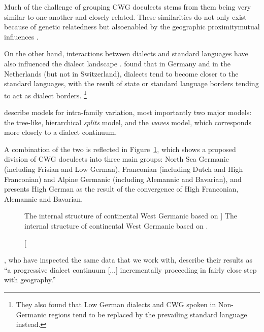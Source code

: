 \documentclass[a4paper]{article}
\begin{document}
Much of the challenge of grouping CWG doculects stems from
them being very similar to one another and closely related.
These similarities do not only exist because of genetic relatedness
but also\textemdash{}enabled by the geographic proximity\textemdash{}mutual influences
\citep[p. 8]{harbert2007germanic}.

On the other hand, 
interactions between dialects and standard languages
have also influenced the dialect landscape
\citep{coetsem1992interaction}.
\citet{kremer1990einfuehrung} found that in Germany and in the Netherlands
(but not in Switzerland), dialects tend to become closer to the standard languages,
with the result of state or standard language borders tending to act as dialect borders.%
\footnote{%
They also found that Low German dialects and CWG spoken in
Non-Germanic regions tend to be replaced by the prevailing standard language instead.}

\citet{heggarty2010splits} describe models for intra-family variation,
most importantly two major models:
the tree-like, hierarchical \textit{splits} model,
and the \textit{waves} model, which corresponds more closely to a dialect continuum.

A combination of the two is reflected in Figure~\ref{fig:cwg_harbert},
which shows a proposed division of CWG doculects
into three main groups: North Sea Germanic (including Frisian and Low German),
Franconian (including Dutch and High Franconian)
and Alpine Germanic (including Alemannic and Bavarian),
and presents High German as the result of the convergence
of High Franconian, Alemannic and Bavarian.

\begin{figure}[H]
\centering

\caption
[The internal structure of continental West Germanic
based on \citet{harbert2007germanic}]
{The internal structure of continental West Germanic
based on \citet[p. 8]{harbert2007germanic}.}
\label{fig:cwg_harbert}
\end{figure}

\citet{heggarty2010splits}, who have inspected the same data
that we work with, describe their results as
``a progressive dialect continuum [...] incrementally proceeding in fairly close step
with geography.''
\end{document}
